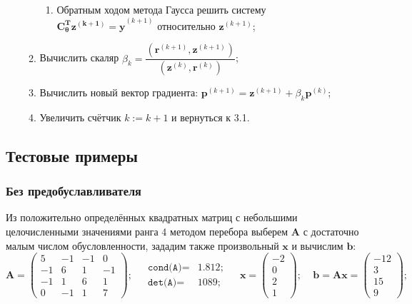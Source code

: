 \begin{enumerate}
\begin{enumerate}
\begin{enumerate}
            \item Обратным ходом метода Гаусса решить систему $\mathbf{C_\theta^T z^{(k+1)} = y}^{(k+1)}$ относительно $\mathbf{z}^{(k+1)}$;
        \end{enumerate}
        \item Вычислить скаляр $\beta_k=\dfrac{(\mathbf{r}^{(k+1)}, \mathbf{z}^{(k+1)})}{(\mathbf{z}^{(k)}, \mathbf{r}^{(k)})}$;
        \item Вычислить новый вектор градиента: $\mathbf{p}^{(k+1)}=\mathbf{z}^{(k+1)}+\beta_k\mathbf{p}^{(k)}$;
        \item Увеличить счётчик $k:=k+1$ и вернуться к 3.1.
    \end{enumerate}
\end{enumerate}


\clearpage

\subsection{Тестовые примеры}
\subsubsection{Без предобуславливателя}
Из положительно определённых квадратных матриц с небольшими целочисленными значениями ранга 4 методом перебора выберем $\mathbf{A}$ с достаточно малым числом обусловленности, зададим также произвольный $\mathbf{x}$ и вычислим $\mathbf{b}$:
\begin{equation}
    \mathbf{A} =
    \begin{pmatrix}
        5  & -1 & -1 & 0  \\
        -1 & 6  & 1  & -1 \\
        -1 & 1  & 6  & 1  \\
        0  & -1 & 1  & 7
    \end{pmatrix}; ~~~~~
    \begin{matrix}
    \texttt{cond(A)}=&1.812;\\
    \texttt{det(A)} =&1089;
    \end{matrix} ~~~~~
    \mathbf{x} = \begin{pmatrix} -2 \\ 0 \\ 2\\ 1 \end{pmatrix}; ~~~~~
    \mathbf{b=Ax} = \begin{pmatrix} -12 \\ 3 \\ 15 \\ 9 \end{pmatrix};
\end{equation}

